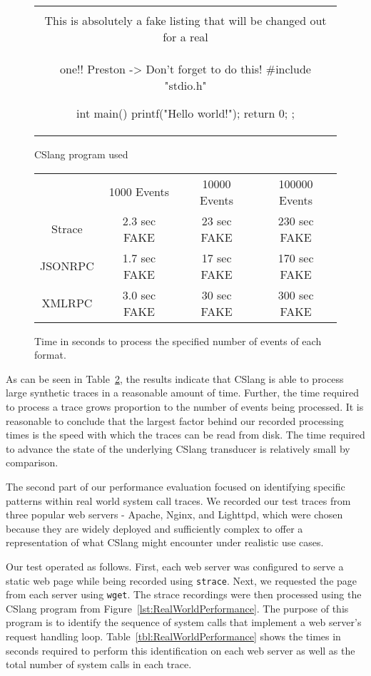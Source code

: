 \begin{figure}[H]
\centering
\begin{tabular}{c}
\begin{lstlisting}
\\ This is absolutely a fake listing that will be changed out for a real
\\ one!!  Preston -> Don't forget to do this!
#include "stdio.h"

int main() {
    printf("Hello world!\n");
    return 0;
};
\end{lstlisting}
\end{tabular}
\caption{CSlang program used }
\label{lst:SyntheticPerformance}
\end{figure}


\begin{figure}
  \begin{tabular}{|c|c|c|c|}
                & 1000 Events   & 10000 Events & 100000 Events \\
  Strace        & 2.3 sec FAKE  & 23 sec FAKE  & 230 sec FAKE  \\
  JSONRPC       & 1.7 sec FAKE  & 17 sec FAKE  & 170 sec FAKE  \\
  XMLRPC        & 3.0 sec FAKE  & 30 sec FAKE  & 300 sec FAKE  \\
\end{tabular}
\caption{Time in seconds to process the specified number of events of each
  format.}
\label{tbl:SyntheticPerformance}
\end{figure}

As can be seen in Table~\ref{tbl:SyntheticPerformance},
the results indicate that CSlang is able to
process large synthetic traces in a reasonable amount of time.  Further,
the time required to process a trace grows proportion to the number of
events being processed.
It is reasonable to conclude that the largest
factor behind our recorded processing times is the speed with which the
traces can be read from disk.  The time required to advance the state of
the underlying CSlang transducer is relatively small by comparison.

The second part of our performance evaluation
focused on identifying specific
patterns within real world system call traces.  We recorded our test traces
from three popular web servers - Apache, Nginx, and Lighttpd, which
were chosen because they are widely deployed and sufficiently
complex to offer a representation of what CSlang might encounter under
realistic use cases.

Our test operated as follows.  First, each web server was configured to
serve a static web page while being recorded using {\tt strace}.  Next, we
requested the page from each server using {\tt wget}.  The strace
recordings were then processed using the CSlang program from
Figure~\ref{lst:RealWorldPerformance}.  The purpose of this program is to
identify the sequence of system calls that implement
a web server's request handling
loop.  Table~\ref{tbl:RealWorldPerformance}
shows the times in seconds required to perform this identification on each
web server as well as the total number of system calls in each trace.

